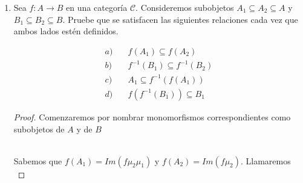 \documentclass{article}
\begin{document}
\begin{enumerate}[label=\textbf{Ej \arabic*.}]
\begin{proof}
Sean $\eta: X\to I\cap B'$, \, $\eta_2: X\to A$ tales que $i\eta_1=f\eta_2$.\\

Observamos que, entonces, $\nu_2\eta_1 : X\to B'$ y es tal que $h(\nu_2\eta_1)=i\eta_1=f\eta_2$.\\

Así, como $f^{-1}(B')$ es pull-back de , existe una única $\gamma' : X\to f^{-1}(B')$ tal que 
$\nu_2\gamma\gamma'=\nu_2\eta_1$ y $\beta_1\gamma'=\eta_2$ pero $\nu_2$ es mono por ser $i$ mono. Entonces 
$\gamma\gamma'=\eta_1$ y $\beta_1\gamma'=\eta_2$.\\

Ahora, si existiera $\alpha: X\to f^{-1}(B')$ tal que $\beta_1\alpha=\eta_2$ y $\gamma\alpha=\eta_1$, entonces 
$\nu_2\gamma\alpha=\gamma_2\eta_1$ y por lo anterior $\alpha=\gamma'$ pues es el único con esas propiedades. Por lo tanto 
$f^{-1}(B')$ es un pull-back, del diagrama (1), e implica que $f^{-1}(I\cap B')$ existe y sea igual a $f^{-1}(B)$ con los morfismos
$\gamma$ y $\beta_1$.

\end{proof}

\item Sea $f:A\to B$ en una categoría $\mathscr{C}$. Consideremos subobjetos $A_1\subseteq A_2\subseteq A$ y  $B_1\subseteq B_2\subseteq B$.
Pruebe que se satisfacen las siguientes relaciones cada vez que ambos lados estén definidos.

\begin{align*}
a)&\quad f(A_1)\subseteq f(A_2)\\
b)&\quad f^{-1}(B_1)\subseteq f^{-1}(B_2)\\
c)&\quad A_1\subseteq f^{-1}(f(A_1))\\
d)&\quad f(f^{-1}(B_1))\subseteq B_1
\end{align*}

\begin{proof}

Comenzaremos por nombrar monomorfismos correspondientes como subobjetos de $A$ y de $B$\\
\centerline{
}\\

 Sabemos que $f(A_1)=Im(f\mu_2\mu_1)$ y $f(A_2)=Im(f\mu_2)$. Llamaremos \\


\end{proof}
\end{enumerate}
\end{document}
